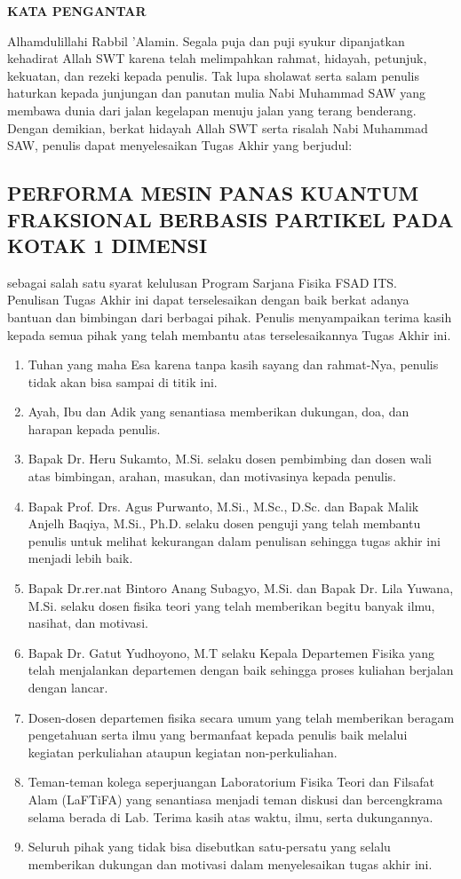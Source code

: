 \begin{center}
	\large{\textbf{KATA PENGANTAR}}
\end{center}
\indent Alhamdulillahi Rabbil 'Alamin. Segala puja dan puji syukur dipanjatkan kehadirat Allah SWT karena telah melimpahkan rahmat, hidayah, petunjuk, kekuatan, dan rezeki kepada penulis. Tak lupa sholawat serta salam penulis haturkan kepada junjungan dan panutan mulia Nabi Muhammad SAW yang membawa dunia dari jalan kegelapan menuju jalan yang terang benderang. Dengan demikian, berkat hidayah Allah SWT serta risalah Nabi Muhammad SAW, penulis dapat menyelesaikan Tugas Akhir yang berjudul:
\begin{center}
	\section*{PERFORMA MESIN PANAS KUANTUM FRAKSIONAL BERBASIS PARTIKEL PADA KOTAK 1 DIMENSI}
\end{center}
sebagai salah satu syarat kelulusan Program Sarjana Fisika FSAD ITS.\\
\indent Penulisan Tugas Akhir ini dapat terselesaikan dengan baik berkat adanya bantuan dan bimbingan dari berbagai pihak. Penulis menyampaikan terima kasih kepada semua pihak yang telah membantu atas terselesaikannya Tugas Akhir ini.
\begin{enumerate}
    \item Tuhan yang maha Esa karena tanpa kasih sayang dan rahmat-Nya, penulis tidak akan bisa sampai di titik ini.
    \item Ayah, Ibu dan Adik yang senantiasa memberikan dukungan, doa, dan harapan kepada penulis.
    \item Bapak Dr. Heru Sukamto, M.Si. selaku dosen pembimbing dan dosen wali atas bimbingan, arahan, masukan, dan motivasinya kepada penulis.
    \item Bapak Prof. Drs. Agus Purwanto, M.Si., M.Sc., D.Sc. dan Bapak Malik Anjelh Baqiya, M.Si., Ph.D. selaku dosen penguji yang telah membantu penulis untuk melihat kekurangan dalam penulisan sehingga tugas akhir ini menjadi lebih baik.
    \item Bapak Dr.rer.nat Bintoro Anang Subagyo, M.Si. dan Bapak Dr. Lila Yuwana, M.Si. selaku dosen fisika teori yang telah memberikan begitu banyak ilmu, nasihat, dan motivasi.
    \item Bapak Dr. Gatut Yudhoyono, M.T selaku Kepala Departemen Fisika yang telah menjalankan departemen dengan baik sehingga proses kuliahan berjalan dengan lancar.
    \item Dosen-dosen departemen fisika secara umum yang telah memberikan beragam pengetahuan serta ilmu yang bermanfaat kepada penulis baik melalui kegiatan perkuliahan ataupun kegiatan non-perkuliahan.
    \item Teman-teman kolega seperjuangan Laboratorium Fisika Teori dan Filsafat Alam (LaFTiFA) yang senantiasa menjadi teman diskusi dan bercengkrama selama berada di Lab. Terima kasih atas waktu, ilmu, serta dukungannya.
    \item Seluruh pihak yang tidak bisa disebutkan satu-persatu yang selalu memberikan dukungan dan motivasi dalam menyelesaikan tugas akhir ini.
\end{enumerate}
